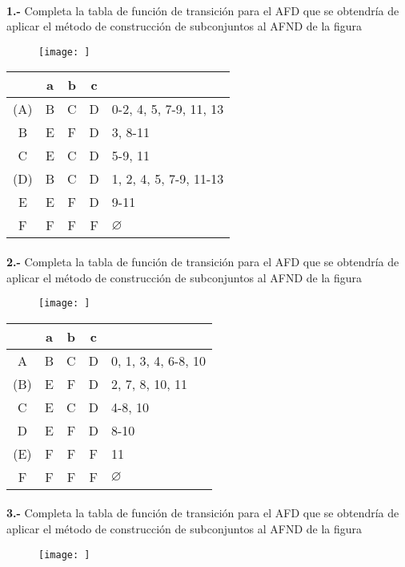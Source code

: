 \documentclass[11pt,a4paper]{report}
\begin{document}
\paragraph{}

\paragraph{}
\textbf{1.-} Completa la tabla de función de transición para el AFD que se obtendría de aplicar el método de construcción de subconjuntos al AFND de la figura
\begin{figure}[ht!]
\centering
\texttt{[image: ]}
\end{figure}

\begin{tabular} {| c | c |c |c | l |}
\hline 
& a & b & c & \\ \hline
(A) & B & C & D & 0-2, 4, 5, 7-9, 11, 13\\ \hline
B & E & F & D & 3, 8-11\\ \hline
C & E & C & D & 5-9, 11\\ \hline
(D) & B & C & D & 1, 2, 4, 5, 7-9, 11-13\\ \hline
E & E & F & D & 9-11\\ \hline
F & F & F & F & $\varnothing$\\ \hline
\end{tabular}\paragraph{}
\textbf{2.-} Completa la tabla de función de transición para el AFD que se obtendría de aplicar el método de construcción de subconjuntos al AFND de la figura
\begin{figure}[ht!]
\centering
\texttt{[image: ]}
\end{figure}

\begin{tabular} {| c | c |c |c | l |}
\hline 
& a & b & c & \\ \hline
A & B & C & D & 0, 1, 3, 4, 6-8, 10\\ \hline
(B) & E & F & D & 2, 7, 8, 10, 11\\ \hline
C & E & C & D & 4-8, 10\\ \hline
D & E & F & D & 8-10\\ \hline
(E) & F & F & F & 11\\ \hline
F & F & F & F & $\varnothing$\\ \hline
\end{tabular}\paragraph{}
\textbf{3.-} Completa la tabla de función de transición para el AFD que se obtendría de aplicar el método de construcción de subconjuntos al AFND de la figura
\begin{figure}[ht!]
\centering
\texttt{[image: ]}
\end{figure}
\end{document}
